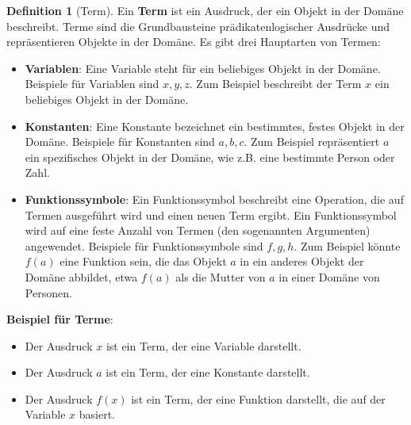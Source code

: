 \documentclass{book}
\theoremstyle{plain}
\theoremstyle{remark}
\theoremstyle{definition}
\newtheorem{definition}{Definition}[section]
\begin{document}
\begin{definition}[Term]
Ein \textbf{Term} ist ein Ausdruck, der ein Objekt in der Domäne beschreibt. Terme sind die Grundbausteine prädikatenlogischer Ausdrücke und repräsentieren Objekte in der Domäne. Es gibt drei Hauptarten von Termen:

\begin{itemize}
    \item \textbf{Variablen}: Eine Variable steht für ein beliebiges Objekt in der Domäne. Beispiele für Variablen sind \(x, y, z\). Zum Beispiel beschreibt der Term \(x\) ein beliebiges Objekt in der Domäne.

    \item \textbf{Konstanten}: Eine Konstante bezeichnet ein bestimmtes, festes Objekt in der Domäne. Beispiele für Konstanten sind \(a, b, c\). Zum Beispiel repräsentiert \(a\) ein spezifisches Objekt in der Domäne, wie z.B. eine bestimmte Person oder Zahl.

    \item \textbf{Funktionssymbole}: Ein Funktionssymbol beschreibt eine Operation, die auf Termen ausgeführt wird und einen neuen Term ergibt. Ein Funktionssymbol wird auf eine feste Anzahl von Termen (den sogenannten Argumenten) angewendet. Beispiele für Funktionssymbole sind \(f, g, h\). Zum Beispiel könnte \(f(a)\) eine Funktion sein, die das Objekt \(a\) in ein anderes Objekt der Domäne abbildet, etwa \(f(a)\) als die Mutter von \(a\) in einer Domäne von Personen.
\end{itemize}

\textbf{Beispiel für Terme}:
\begin{itemize}
    \item Der Ausdruck \(x\) ist ein Term, der eine Variable darstellt.
    \item Der Ausdruck \(a\) ist ein Term, der eine Konstante darstellt.
    \item Der Ausdruck \(f(x)\) ist ein Term, der eine Funktion darstellt, die auf der Variable \(x\) basiert.
\end{itemize}

\end{definition}
\end{document}
